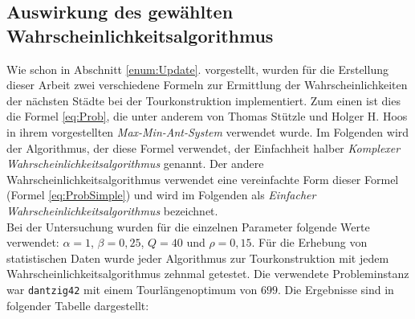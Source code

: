 \documentclass[doktyp=barbeit, sprache=german]{TUBAFarbeiten}
\begin{document}
\subsection{Auswirkung des gewählten Wahrscheinlichkeitsalgorithmus}
\label{AuswirkungWA}
Wie schon in Abschnitt \ref{enum:Update}. vorgestellt, wurden für die Erstellung dieser Arbeit zwei verschiedene Formeln zur Ermittlung der Wahrscheinlichkeiten der nächsten Städte bei der Tourkonstruktion implementiert. Zum einen ist dies die Formel \ref{eq:Prob}, die unter anderem von Thomas Stützle und Holger H. Hoos in ihrem vorgestellten \textit{Max-Min-Ant-System} verwendet wurde. Im Folgenden wird der Algorithmus, der diese Formel verwendet, der Einfachheit halber \textit{Komplexer Wahrscheinlichkeitsalgorithmus} genannt. Der andere Wahrscheinlichkeitsalgorithmus verwendet eine vereinfachte Form dieser Formel (Formel \ref{eq:ProbSimple}) und wird im Folgenden als \textit{Einfacher Wahrscheinlichkeitsalgorithmus} bezeichnet.
\\Bei der Untersuchung wurden für die einzelnen Parameter folgende Werte verwendet: $\alpha = 1$, $\beta = 0,25$, $Q = 40$ und $\rho = 0,15$. Für die Erhebung von statistischen Daten wurde jeder Algorithmus zur Tourkonstruktion mit jedem Wahrscheinlichkeitsalgorithmus zehnmal getestet. Die verwendete Probleminstanz war \texttt{dantzig42} mit einem Tourlängenoptimum von $699$.
\newpage
Die Ergebnisse sind in folgender Tabelle dargestellt:
\begin{table}[]
\captionsetup{justification=centering}
\centering
{}
\caption[Ergebnisse für die einzelnen Algorithmen in Abhängigkeit des gewählten Wahrscheinlichkeitsalgorithmus]{Ergebnisse für die einzelnen Algorithmen in Abhängigkeit des gewählten Wahrscheinlichkeitsalgorithmus. Die Prozentzahl hinter der Tourlänge zeigt die Abweichung vom Tourlängenoptimum $d = 699$ an}
\label{table:Prob}
\end{table}
\end{document}

